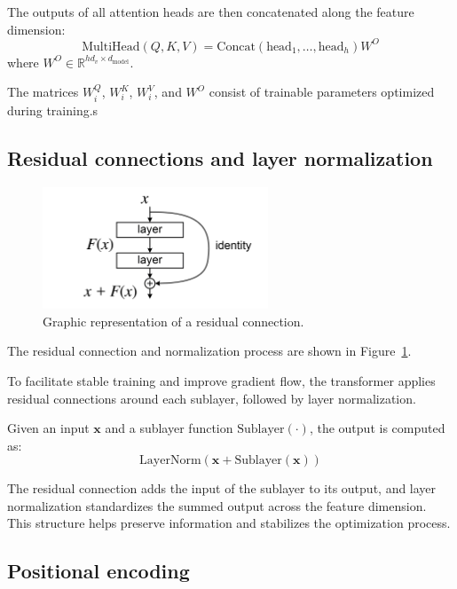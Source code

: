 \documentclass{pracalicmgr}
\begin{document}
The outputs of all attention heads are then concatenated along the feature dimension:
\[
\text{MultiHead}(Q, K, V) = \text{Concat}(\text{head}_1, \ldots, \text{head}_h)W^O
\]
where \( W^O \in \mathbb{R}^{hd_v \times d_{\text{model}}} \).

The matrices \( W^Q_i \), \( W^K_i \), \( W^V_i \), and \( W^O \) consist of trainable parameters optimized during training.s

\subsection{Residual connections and layer normalization}

\begin{figure}[h]
    \centering
    \includegraphics[width=0.6\textwidth]{src/ResBlock.png}
    \caption{Graphic representation of a residual connection.}
    \label{fig:resCon}
\end{figure}

The residual connection and normalization process are shown in Figure~\ref{fig:resCon}.

To facilitate stable training and improve gradient flow, the transformer applies residual connections around each sublayer, followed by layer normalization.

Given an input \( \mathbf{x} \) and a sublayer function \( \text{Sublayer}(\cdot) \), the output is computed as:
\[
\text{LayerNorm}(\mathbf{x} + \text{Sublayer}(\mathbf{x}))
\]

The residual connection adds the input of the sublayer to its output, and layer normalization standardizes the summed output across the feature dimension. This structure helps preserve information and stabilizes the optimization process.


\subsection{Positional encoding}
\end{document}
